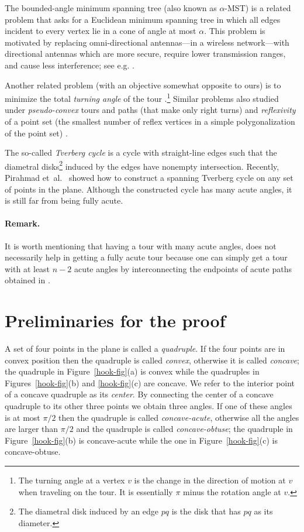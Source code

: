 \documentclass[11pt,letter]{article}
\newcommand{\etal}{{et~al.}}
\begin{document}
The bounded-angle minimum spanning tree (also known as $\alpha$-MST) is a related problem that asks for a Euclidean minimum spanning tree in which all edges incident to every vertex lie in a cone of angle at most $\alpha$. This problem is motivated by replacing omni-directional antennas---in a wireless network---with directional antennas which are more secure, require lower transmission ranges, and cause less interference; see e.g. \cite{Aschner2017,Aschner2012,Biniaz2020,Biniaz2022,Tran2017}. 


Another related problem (with an  objective somewhat opposite to ours) is to minimize the total {\em turning angle} of the tour \cite{Aggarwal1999}.\footnote{The turning angle at a vertex $v$ is the change in the direction of motion at $v$ when traveling on the tour. It is essentially $\pi$ minus the rotation angle at $v$.} Similar problems also studied under {\em pseudo-convex} tours and paths (that make only right turns) \cite{Fekete1997} and {\em reflexivity} of a point set (the smallest number
of reflex vertices in a simple polygonalization of the point set) \cite{Ackerman2009,Arkin2003}.

The so-called {\em Tverberg cycle} is a cycle with straight-line edges such that the diametral disks\footnote{The diametral disk induced by an edge $pq$ is the disk that has $pq$ as its diameter.} induced by the edges have nonempty intersection. Recently, Pirahmad \etal~\cite{Pirahmad2021} showed how to construct a spanning Tverberg cycle on any set of points in the plane. Although the constructed cycle has many acute angles, it is still far from being fully acute. 

\paragraph{Remark.}It is worth mentioning that having a tour with many acute angles, does not necessarily help in getting a fully acute tour because one can simply get a tour with at least $n-2$ acute angles by interconnecting the endpoints of acute paths obtained in \cite{Carmi2011,Fekete1997}.

\section{Preliminaries for the proof}
\label{preliminaries}

A set of four points in the plane is called a {\em quadruple}. If the four points are in convex position then the quadruple is called {\em convex}, otherwise it is called {\em concave}; the quadruple in Figure~\ref{hook-fig}(a) is convex while the quadruples in Figures~\ref{hook-fig}(b) and \ref{hook-fig}(c) are concave. We refer to the interior point of a concave quadruple as its {\em center}. By connecting the center of a concave quadruple to its other three points we obtain three angles. If one of these angles is at most $\pi/2$ then the quadruple is called {\em concave-acute}, otherwise all the angles are larger than $\pi/2$ and the quadruple is called {\em concave-obtuse}; the quadruple in Figure~\ref{hook-fig}(b) is concave-acute while the one in Figure~\ref{hook-fig}(c) is concave-obtuse. 
\end{document}
